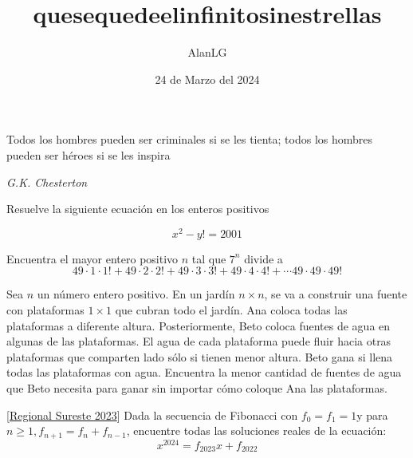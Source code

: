 \documentclass[11pt]{scrartcl}
\title{quesequedeelinfinitosinestrellas}
\author{AlanLG}
\date{24 de Marzo del 2024}
\begin{document}
\maketitle

\epigraph{Todos los hombres pueden ser criminales si se les tienta; todos los hombres pueden ser héroes si se les inspira}
{\emph{G.K. Chesterton }}


\begin{problem} Resuelve la siguiente ecuación en los enteros positivos
    
    \[x^2-y!=2001\]
    
    
    

\end{problem}
\vspace{2cm}
\begin{problem}
    Encuentra el mayor entero positivo $n$ tal que $7^n$
    divide a 
    \[49\cdot 1\cdot 1!+49\cdot 2\cdot 2!+49\cdot 3\cdot 3!+49\cdot 4\cdot 4!+\cdots 49\cdot 49\cdot 49!\]
\end{problem}
\vspace{2cm}
\begin{problem}
    Sea $n$ un número entero positivo. En un jardín $n\times n$, se va a construir una fuente con plataformas $1\times 1$ que cubran todo el jardín. Ana coloca todas las plataformas a diferente altura. Posteriormente, Beto coloca fuentes de agua en algunas de las plataformas. El agua de cada plataforma puede fluir hacia otras plataformas que comparten lado sólo si tienen menor altura. Beto gana si llena todas las plataformas con agua.
    Encuentra la menor cantidad de fuentes de agua que Beto necesita para ganar sin importar cómo coloque Ana las plataformas.
\begin{center}

\end{center}
\end{problem}
\vspace{2cm}
\begin{problem}
 
[\href{https://chiuchang.org/wp-content/uploads/sites/2/2018/01/2016_TIMC_Keystage_III_Team_Final.x17381.pdf}{Regional Sureste 2023}] 
Dada la secuencia de Fibonacci con $f_0=f_1=1$y para $n\geq 1, f_{n+1}=f_n+f_{n-1}$, encuentre todas las soluciones reales de la ecuación:
\[x^{ 2024}=f_{2023}x+f_{2022}\]
\end{problem}
\end{document}
